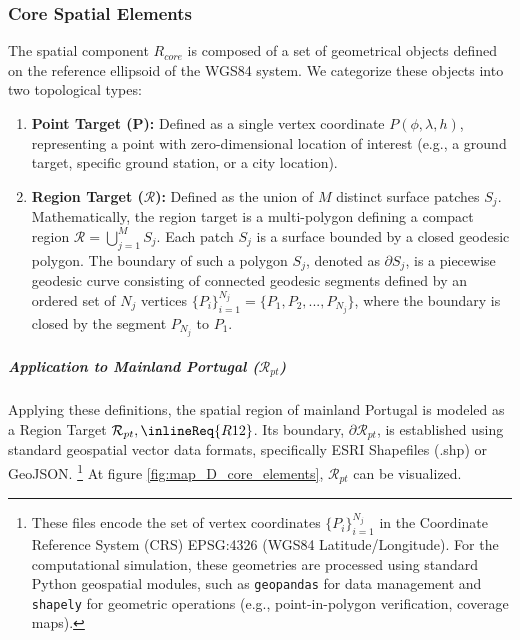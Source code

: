 \subsubsection{Core Spatial Elements}

The spatial component $R_{core}$ is composed of a set of geometrical objects defined on the reference ellipsoid of the WGS84 system. We categorize these objects into two topological types:

\begin{enumerate}
    \item \textbf{Point Target (P):} Defined as a single vertex coordinate $P(\phi, \lambda, h)$, representing a point with zero-dimensional location of interest (e.g., a ground target, specific ground station, or a city location).

    \item \textbf{Region Target ($\mathcal{R}$):} Defined as the union of $M$ distinct surface patches $S_j$. Mathematically, the region target is a multi-polygon defining a compact region $\mathcal{R} = \bigcup_{j=1}^{M} S_j$. Each patch $S_j$ is a surface bounded by a closed geodesic polygon. The boundary of such a polygon $S_j$, denoted as $\partial S_j$, is a piecewise geodesic curve consisting of connected geodesic segments defined by an ordered set of $N_j$ vertices $\{P_{i}\}_{i=1}^{N_j} = \{P_{1}, P_{2}, ..., P_{N_{j}}\}$, where the boundary is closed by the segment $P_{N_{j}}$ to $P_{1}$.
\end{enumerate}


\subparagraph{Application to Mainland Portugal ($\mathcal{R}_{pt}$)}\hspace{0pt}

Applying these definitions, the spatial region of mainland Portugal is modeled as a Region Target $\mathcal{R}_{pt}, \inlineReq{R12}$. 
Its boundary, $\partial \mathcal{R}_{pt}$, is established using standard geospatial vector data formats, specifically ESRI Shapefiles (.shp) or GeoJSON. \footnote{These files encode the set of vertex coordinates $\{P_{i}\}_{i=1}^{N_j}$ in the Coordinate Reference System (CRS) EPSG:4326 (WGS84 Latitude/Longitude). For the computational simulation, these geometries are processed using standard Python geospatial modules, such as \texttt{geopandas} for data management and \texttt{shapely} for geometric operations (e.g., point-in-polygon verification, coverage maps).}
At figure \ref{fig:map_D_core_elements}, $\mathcal{R}_{pt}$ can be visualized.


